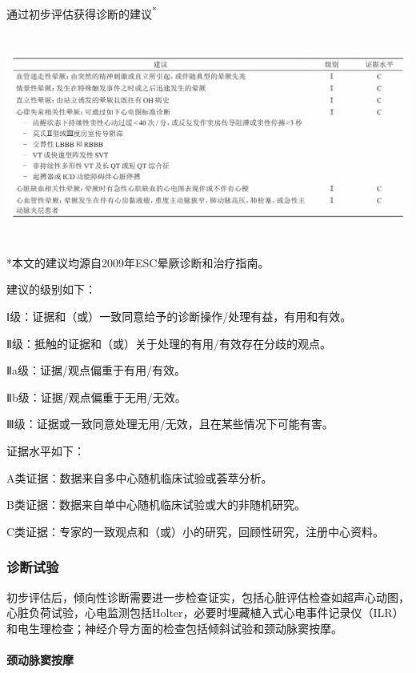 \begin{table}[htbp]
\begin{center}
\caption{通过初步评估获得诊断的建议\textsuperscript{*}}
\label{tab4-3}
\includegraphics[width=6.66667in,height=2.69792in]{./images/Image00020.jpg}
\end{center}

{\small
*本文的建议均源自2009年ESC晕厥诊断和治疗指南。

建议的级别如下：

Ⅰ级：证据和（或）一致同意给予的诊断操作/处理有益，有用和有效。

Ⅱ级：抵触的证据和（或）关于处理的有用/有效存在分歧的观点。

Ⅱa级：证据/观点偏重于有用/有效。

Ⅱb级：证据/观点偏重于无用/无效。

Ⅲ级：证据或一致同意处理无用/无效，且在某些情况下可能有害。

证据水平如下：

A类证据：数据来自多中心随机临床试验或荟萃分析。

B类证据：数据来自单中心随机临床试验或大的非随机研究。

C类证据：专家的一致观点和（或）小的研究，回顾性研究，注册中心资料。}
\end{table}

\subsubsection{诊断试验}

初步评估后，倾向性诊断需要进一步检查证实，包括心脏评估检查如超声心动图，心脏负荷试验，心电监测包括Holter，必要时埋藏植入式心电事件记录仪（ILR）和电生理检查；神经介导方面的检查包括倾斜试验和颈动脉窦按摩。

\paragraph{颈动脉窦按摩}

